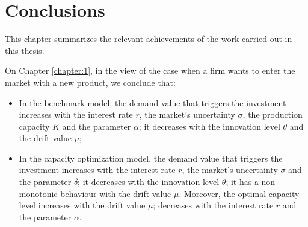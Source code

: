 
\chapter{Conclusions}
\label{chapter:conc}

This chapter summarizes the relevant achievements of the work carried out in this thesis.

On Chapter \ref{chapter:1}, in the view of the case when a firm wants to enter the market with a new product, we conclude that:
\begin{itemize}
	\item In the benchmark model, the demand value that triggers the investment increases with the interest rate $r$, the market's uncertainty $\sigma$, the production capacity $K$ and the parameter $\alpha$; it decreases with the innovation level $\theta$ and the drift value $\mu$;
	\item In the capacity optimization model, the demand value that triggers the investment increases with the interest rate $r$, the market's uncertainty $\sigma$ and the parameter $\delta$; it decreases with the innovation level $\theta$; it has a non-monotonic behaviour with the drift value $\mu$.
	Moreover, the optimal capacity level increases with the drift value $\mu$; decreases with the interest rate $r$ and the parameter $\alpha$.
\end{itemize}

